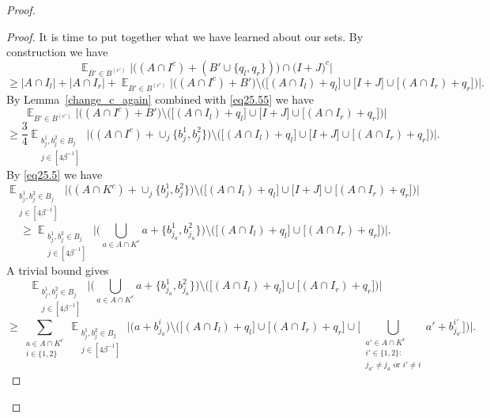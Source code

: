 \documentclass[12pt,reqno]{amsart}
\DeclareMathOperator*{\E}{\mathbb{E}}
\theoremstyle{definition}
\renewcommand\ge{\geqslant}
\begin{document}
\begin{proof}
\begin{proof}
\vspace{10pt}
It is time to put together what we have learned about our sets. By construction we have
\begin{equation}\label{eq25.6}
\E_{B'\in B^{(c')}}\bigg|\bigg((A\cap I^c)+(B'\cup \{q_l,q_r\})\bigg)\cap \bigg(I+J\bigg)^c\bigg|
\end{equation}
\begin{equation*}\label{eq25.7}
\ge \bigg|A\cap I_l \bigg|+ \bigg|A\cap I_r\bigg|+ \E_{B'\in B^{(c')}}\bigg|\bigg((A\cap I^c)+B'\bigg)\setminus \bigg(\big[(A\cap I_l)+q_l\big]\cup \big[I+J\big]\cup \big[(A\cap I_r)+q_r\big]\bigg)\bigg|.
\end{equation*}
By Lemma~\ref{change_c_again} combined with \eqref{eq25.55} we have
\begin{equation}\label{eq25.8}
\E_{B'\in B^{(c')}}\bigg|\bigg((A\cap I^c)+B'\bigg)\setminus \bigg(\big[(A\cap I_l)+q_l\big]\cup \big[I+J\big]\cup \big[(A\cap I_r)+q_r\big]\bigg)\bigg|
\end{equation}
\begin{equation*}
\ge \frac{3}{4}\E_{\substack{b_j^1,b_j^2\in B_j \\ j \in [4\beta^{-1}]} }\bigg|\bigg((A\cap I^c)+\cup_j\{b_j^1,b_j^2\}\bigg)\setminus \bigg(\big[(A\cap I_l)+q_l\big]\cup \big[I+J\big]\cup \big[(A\cap I_r)+q_r\big]\bigg)\bigg|.
\end{equation*}
By \eqref{eq25.5} we have
\begin{equation}\label{eq25.10}
\E_{\substack{b_j^1,b_j^2\in B_j \\ j\in[4\beta^{-1}]} }\bigg|\bigg((A\cap K^c)+\cup_j\{b_j^1,b_j^2\}\bigg)\setminus \bigg(\big[(A\cap I_l)+q_l\big]\cup \big[I+J\big]\cup \big[(A\cap I_r)+q_r\big]\bigg)\bigg|
\end{equation}
\begin{equation*}\label{eq25.115}
\ge \E_{\substack{b_j^1,b_j^2\in B_j\\ j\in[4\beta^{-1}]} }\bigg|\bigg(\bigcup_{a\in A\cap K^c}a+\{b_{j_a}^1,b_{j_a}^2\}\bigg)\setminus \bigg(\big[(A\cap I_l)+q_l\big]\cup \big[(A\cap I_r)+q_r\big]\bigg)\bigg|.
\end{equation*}
A trivial bound gives
\begin{equation}\label{eq25.117}
\E_{\substack{b_j^1,b_j^2\in B_j \\ j\in[4\beta^{-1}]} }\bigg|\bigg(\bigcup_{a\in A\cap K^c}a+\{b_{j_a}^1,b_{j_a}^2\}\bigg)\setminus \bigg(\big[(A\cap I_l)+q_l\big]\cup \big[(A\cap I_r)+q_r\big]\bigg)\bigg|
\end{equation}
\begin{equation*}\label{eq25.13}
\ge \sum_{\substack{a \in A\cap K^c \\ i \in \{1,2\}}}\E_{\substack{b_j^1,b_j^2\in B_j\\ j\in[4\beta^{-1}]} }\bigg|\bigg(a+b_{j_a}^i\bigg)\setminus \bigg(\big[(A\cap I_l)+q_l\big]\cup \big[(A\cap I_r)+q_r\big] \cup \big[ \bigcup_{\substack{a' \in A\cap K^c \\ i' \in \{1,2\}: \\ j_{a'}\neq j_a \text{ or } i' \neq i }} a'+b_{j_{a'}}^{i'} \big] \bigg)\bigg|.
\end{equation*}


\end{proof}
\end{proof}
\end{document}
